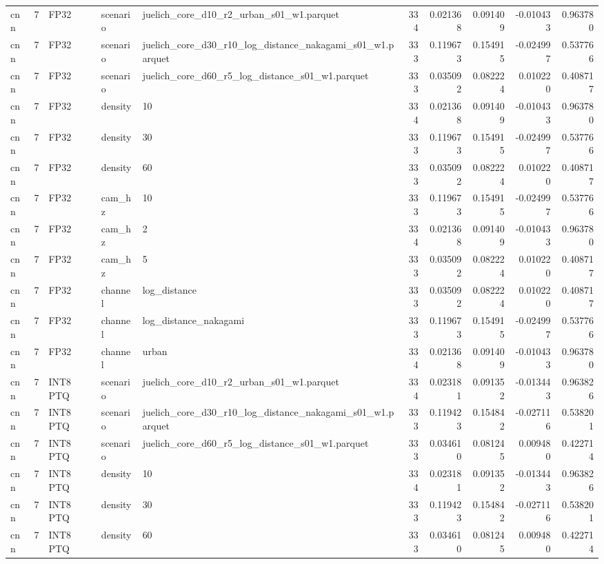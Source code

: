 \begin{tabular}{lrlllrrrrr}
cnn & 7 & FP32 & scenario & juelich\_core\_d10\_r2\_urban\_s01\_w1.parquet & 334 & 0.021368 & 0.091409 & -0.010433 & 0.963780 \\
cnn & 7 & FP32 & scenario & juelich\_core\_d30\_r10\_log\_distance\_nakagami\_s01\_w1.parquet & 333 & 0.119673 & 0.154915 & -0.024997 & 0.537766 \\
cnn & 7 & FP32 & scenario & juelich\_core\_d60\_r5\_log\_distance\_s01\_w1.parquet & 333 & 0.035092 & 0.082224 & 0.010220 & 0.408717 \\
cnn & 7 & FP32 & density & 10 & 334 & 0.021368 & 0.091409 & -0.010433 & 0.963780 \\
cnn & 7 & FP32 & density & 30 & 333 & 0.119673 & 0.154915 & -0.024997 & 0.537766 \\
cnn & 7 & FP32 & density & 60 & 333 & 0.035092 & 0.082224 & 0.010220 & 0.408717 \\
cnn & 7 & FP32 & cam\_hz & 10 & 333 & 0.119673 & 0.154915 & -0.024997 & 0.537766 \\
cnn & 7 & FP32 & cam\_hz & 2 & 334 & 0.021368 & 0.091409 & -0.010433 & 0.963780 \\
cnn & 7 & FP32 & cam\_hz & 5 & 333 & 0.035092 & 0.082224 & 0.010220 & 0.408717 \\
cnn & 7 & FP32 & channel & log\_distance & 333 & 0.035092 & 0.082224 & 0.010220 & 0.408717 \\
cnn & 7 & FP32 & channel & log\_distance\_nakagami & 333 & 0.119673 & 0.154915 & -0.024997 & 0.537766 \\
cnn & 7 & FP32 & channel & urban & 334 & 0.021368 & 0.091409 & -0.010433 & 0.963780 \\
cnn & 7 & INT8 PTQ & scenario & juelich\_core\_d10\_r2\_urban\_s01\_w1.parquet & 334 & 0.023181 & 0.091352 & -0.013443 & 0.963826 \\
cnn & 7 & INT8 PTQ & scenario & juelich\_core\_d30\_r10\_log\_distance\_nakagami\_s01\_w1.parquet & 333 & 0.119423 & 0.154842 & -0.027116 & 0.538201 \\
cnn & 7 & INT8 PTQ & scenario & juelich\_core\_d60\_r5\_log\_distance\_s01\_w1.parquet & 333 & 0.034610 & 0.081245 & 0.009480 & 0.422714 \\
cnn & 7 & INT8 PTQ & density & 10 & 334 & 0.023181 & 0.091352 & -0.013443 & 0.963826 \\
cnn & 7 & INT8 PTQ & density & 30 & 333 & 0.119423 & 0.154842 & -0.027116 & 0.538201 \\
cnn & 7 & INT8 PTQ & density & 60 & 333 & 0.034610 & 0.081245 & 0.009480 & 0.422714 \\

\end{tabular}
